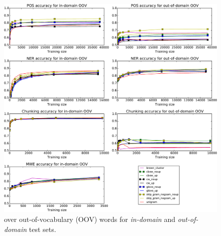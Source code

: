 \begin{figure}[t]
\centering
    	\includegraphics[scale=0.5]{plots/OOV-plots}
\caption{\accuracy over out-of-vocabulary (OOV) words for \textit{in-domain} and \textit{out-of-domain} test sets.}
\label{OOV} 
\end{figure}







